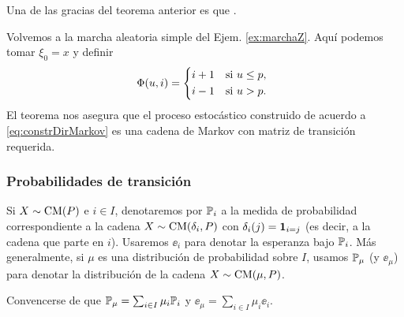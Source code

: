 Una de las gracias del teorema anterior es que .

\begin{ex}
Volvemos a la marcha aleatoria simple del Ejem. \ref{ex:marchaZ}.
Aquí podemos tomar $\xi_0=x$ y definir
\[\Phi(u,i)=\begin{dcases*}
i+1 & si $u\leq p$,\\
i-1 & si $u>p$.
\end{dcases*}\]
El teorema nos asegura que el proceso estocástico construido de acuerdo a \eqref{eq:constrDirMarkov} es una cadena de Markov con matriz de transición requerida.
\end{ex}

\subsubsection{Probabilidades de transición}

\begin{notation}
Si $X\sim\text{\upshape{CM}}(P)$ e $i\in I$, denotaremos por $\mathbb{P}_i$ a la medida de probabilidad correspondiente a la cadena $X\sim\text{\upshape{CM}}(\delta_i,P)$ con $\delta_i(j)=\mathbf{1}_{i=j}$ (es decir, a la cadena que parte en $i$).
Usaremos $\ee_i$ para denotar la esperanza bajo $\mathbb{P}_i$.
\lsep
Más generalmente, si $\mu$ es una distribución de probabilidad sobre $I$, usamos $\mathbb{P}_\mu$ (y $\ee_\mu$) para denotar la distribución de la cadena $X\sim\text{\upshape{CM}}(\mu,P)$.
\end{notation}

\begin{exer}
Convencerse de que $\mathbb{P}_\mu=\sum_{i\in I}\mu_i\mathbb{P}_i$ y $\ee_\mu=\sum_{i\in I}\mu_i\ee_i$.
\end{exer}

